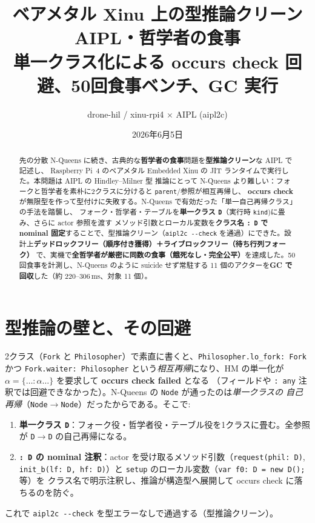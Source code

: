 \documentclass[11pt]{ltjsarticle}
\title{\textbf{ベアメタル Xinu 上の型推論クリーン AIPL・哲学者の食事}\\
\large 単一クラス化による occurs check 回避、50回食事ベンチ、GC 実行}
\author{drone-hil / xinu-rpi4 $\times$ AIPL (aipl2c)}
\date{2026年6月5日}
\begin{document}
\maketitle

\begin{abstract}
先の分散 N-Queens に続き、古典的な\textbf{哲学者の食事}問題を\textbf{型推論クリーン}な AIPL で記述し、
Raspberry Pi~4 のベアメタル Embedded Xinu の JIT ランタイムで実行した。本問題は AIPL の Hindley--Milner 型
推論にとって N-Queens より難しい：フォークと哲学者を素朴に2クラスに分けると \texttt{parent}/参照が相互再帰し、
\textbf{occurs check} が無限型を作って型付けに失敗する。N-Queens で有効だった「単一自己再帰クラス」の手法を踏襲し、
フォーク・哲学者・テーブルを\textbf{単一クラス \texttt{D}}（実行時 \texttt{kind})に畳み、さらに actor 参照を渡す
メソッド引数とローカル変数を\textbf{クラス名 \texttt{: D} で nominal 固定}することで、型推論クリーン（\texttt{aipl2c
-{}-check} を通過）にできた。設計上\textbf{デッドロックフリー（順序付き獲得）＋ライブロックフリー（待ち行列フォーク）}
で、実機で\textbf{全哲学者が厳密に同数の食事（餓死なし・完全公平）}を達成した。50回食事を計測し、N-Queens のように
suicide せず常駐する 11 個のアクターを\textbf{GC で回収}した（約 220--306\,ms、対象 11 個）。
\end{abstract}

\section{型推論の壁と、その回避}
2クラス（\texttt{Fork} と \texttt{Philosopher}）で素直に書くと、\texttt{Philosopher.lo\_fork:\,Fork} かつ
\texttt{Fork.waiter:\,Philosopher} という\emph{相互再帰}になり、HM の単一化が
$\alpha = \{\dots : \alpha \dots\}$ を要求して \textbf{occurs check failed} となる
（フィールドや \texttt{: any} 注釈では回避できなかった）。N-Queens の \texttt{Node} が通ったのは\emph{単一クラスの
自己再帰}（\texttt{Node}$\to$\texttt{Node}）だったからである。そこで:
\begin{enumerate}
  \item \textbf{単一クラス \texttt{D}}：フォーク役・哲学者役・テーブル役を1クラスに畳む。全参照が
  \texttt{D}$\to$\texttt{D} の自己再帰になる。
  \item \textbf{\texttt{: D} の nominal 注釈}：actor を受け取るメソッド引数（\texttt{request(phil: D)},
  \texttt{init\_b(lf: D, hf: D)}）と \texttt{setup} のローカル変数（\texttt{var f0: D = new D();} 等）を
  クラス名で明示注釈し、推論が構造型へ展開して occurs check に落ちるのを防ぐ。
\end{enumerate}
これで \texttt{aipl2c -{}-check} を型エラーなしで通過する（型推論クリーン）。
\end{document}
